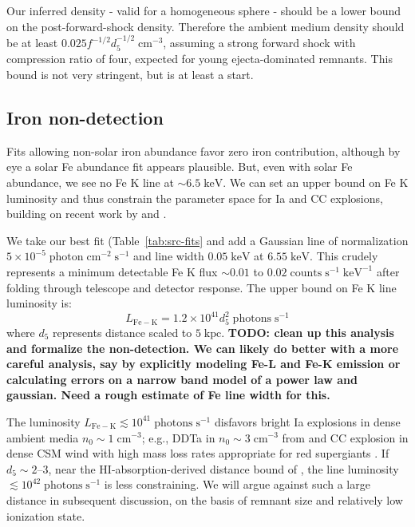 \documentclass[preprint2,tighten,trackchanges]{aastex6}
\newcommand*{\mt}{\mathrm}
\newcommand*{\unit}[1]{\;\mt{#1}}  %
\newcommand*{\abt}{\mathord{\sim}} %
\begin{document}
Our inferred density - valid for a homogeneous sphere - should be a lower bound
on the post-forward-shock density.
Therefore the ambient medium density should be at least
$0.025 f^{-1/2} d_{5}^{-1/2} \unit{cm^{-3}}$, assuming a strong forward shock
with compression ratio of four, expected for young ejecta-dominated remnants.
This bound is not very stringent, but is at least a start.

\subsection{Iron non-detection}

Fits allowing non-solar iron abundance favor zero iron contribution, although
by eye a solar Fe abundance fit appears plausible.
But, even with solar Fe abundance, we see no Fe K line at $\abt 6.5 \unit{keV}$.
We can set an upper bound on Fe K luminosity and thus constrain the parameter
space for Ia and CC explosions, building on recent work by
\citet{yamaguchi2014-iron} and \citet{patnaude2015}.

We take our best fit (Table~\ref{tab:src-fits} and add a Gaussian line of
normalization $5 \times 10^{-5} \unit{photon\;cm^{-2}\;s^{-1}}$ and
line width $0.05 \unit{keV}$ at $6.55 \unit{keV}$.
This crudely represents a minimum detectable Fe K flux
$\abt 0.01$ to $0.02 \unit{counts\;s^{-1}\;keV^{-1}}$ after folding through
telescope and detector response.
The upper bound on Fe K line luminosity is:
\[
    L_{\mt{Fe-K}} = 1.2 \times 10^{41} d_5^2 \unit{photons\;s^{-1}}
\]
where $d_5$ represents distance scaled to $5 \unit{kpc}$.
\textbf{TODO: clean up this analysis and formalize the non-detection.
We can likely do better with a more careful analysis, say by explicitly
modeling Fe-L and Fe-K emission or calculating errors on a narrow band model of
a power law and gaussian.  Need a rough estimate of Fe line width for this.}

The luminosity $L_{\mt{Fe-K}} \lesssim 10^{41} \unit{photons\;s^{-1}}$
disfavors bright Ia explosions in dense ambient media
$n_0 \sim 1 \unit{cm^{-3}}$; e.g., DDTa in $n_0 \sim 3 \unit{cm^{-3}}$ from
\citet{badenes2003, badenes2005, badenes2006} \citep{yamaguchi2014-iron}
and CC explosion in dense CSM wind with high mass loss rates appropriate for
red supergiants \citep{patnaude2015}.
If $d_5 \sim 2$--$3$, near the HI-absorption-derived distance bound of
\citet{gaensler1998-g309}, the line luminosity
$\lesssim 10^{42} \unit{photons\;s^{-1}}$ is less constraining.
We will argue against such a large distance in subsequent discussion, on
the basis of remnant size and relatively low ionization state.
\end{document}
